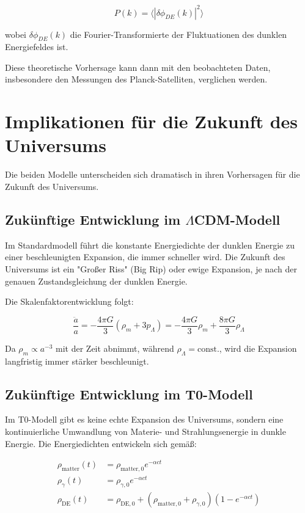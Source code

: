 \documentclass[a4paper,12pt]{article}
\theoremstyle{definition}
\theoremstyle{remark}
\begin{document}
	\begin{equation}
		P(k) = \langle|\delta\phi_{DE}(k)|^2\rangle
	\end{equation}
	
	wobei $\delta\phi_{DE}(k)$ die Fourier-Transformierte der Fluktuationen des dunklen Energiefeldes ist.
	
	Diese theoretische Vorhersage kann dann mit den beobachteten Daten, insbesondere den Messungen des Planck-Satelliten, verglichen werden.
	
	\section{Implikationen für die Zukunft des Universums}
	Die beiden Modelle unterscheiden sich dramatisch in ihren Vorhersagen für die Zukunft des Universums.
	
	\subsection{Zukünftige Entwicklung im $\Lambda$CDM-Modell}
	Im Standardmodell führt die konstante Energiedichte der dunklen Energie zu einer beschleunigten Expansion, die immer schneller wird. Die Zukunft des Universums ist ein "Großer Riss" (Big Rip) oder ewige Expansion, je nach der genauen Zustandsgleichung der dunklen Energie.
	
	Die Skalenfaktorentwicklung folgt:
	
	\begin{equation}
		\frac{\ddot{a}}{a} = -\frac{4\pi G}{3}(\rho_m + 3p_\Lambda) = -\frac{4\pi G}{3}\rho_m + \frac{8\pi G}{3}\rho_\Lambda
	\end{equation}
	
	Da $\rho_m \propto a^{-3}$ mit der Zeit abnimmt, während $\rho_\Lambda = \text{const.}$, wird die Expansion langfristig immer stärker beschleunigt.
	
	\subsection{Zukünftige Entwicklung im T0-Modell}
	Im T0-Modell gibt es keine echte Expansion des Universums, sondern eine kontinuierliche Umwandlung von Materie- und Strahlungsenergie in dunkle Energie. Die Energiedichten entwickeln sich gemäß:
	
	\begin{align}
		\rho_{\text{matter}}(t) &= \rho_{\text{matter},0} e^{-\alpha c t} \\
		\rho_{\gamma}(t) &= \rho_{\gamma,0} e^{-\alpha c t} \\
		\rho_{\text{DE}}(t) &= \rho_{\text{DE},0} + (\rho_{\text{matter},0} + \rho_{\gamma,0})(1 - e^{-\alpha c t})
	\end{align}
	
\end{document}
